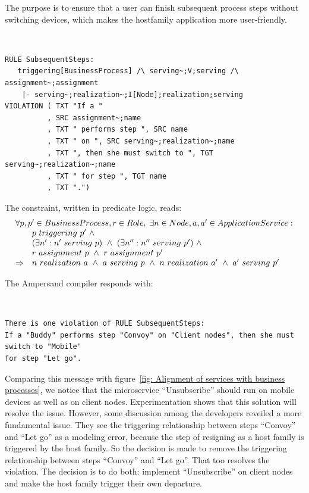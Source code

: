 \documentclass[sn-vancouver]{sn-jnl}%
\begin{document}
The purpose is to ensure that a user can finish subsequent process steps without switching devices,
which makes the hostfamily application more user-friendly.

{\tt\small
\begin{lstlisting}[frame=single, label={mc4}, caption={}]
RULE SubsequentSteps:
   triggering[BusinessProcess] /\ serving~;V;serving /\ assignment~;assignment
    |- serving~;realization~;I[Node];realization;serving
VIOLATION ( TXT "If a "
          , SRC assignment~;name
          , TXT " performs step ", SRC name
          , TXT " on ", SRC serving~;realization~;name
          , TXT ", then she must switch to ", TGT serving~;realization~;name
          , TXT " for step ", TGT name
          , TXT ".")
\end{lstlisting}
}

The constraint, written in predicate logic, reads:
\[\begin{array}{cl}
   \multicolumn{2}{l}{\forall p,p' \in BusinessProcess, r\in Role, \;\exists n\in Node, a,a'\in ApplicationService:}\\
   &p\ triggering\ p'\ \wedge\\
   &(\exists n': n'\ serving\ p)\ \wedge\ (\exists n'': n''\ serving\ p')\ \wedge\\
   &r\ assignment\ p\ \wedge\ r\ assignment\ p'\\
   \Rightarrow&n\ realization\ a\ \wedge\ a\ serving\ p\ \wedge\ n\ realization\ a'\ \wedge\ a'\ serving\ p'\\
\end{array}\]

The Ampersand compiler responds with:

{\tt\small
\begin{lstlisting}[frame=single, label={mc4result}, caption={}]
There is one violation of RULE SubsequentSteps:
If a "Buddy" performs step "Convoy" on "Client nodes", then she must switch to "Mobile"
for step "Let go".
\end{lstlisting}
}

Comparing this message with figure~\ref{fig: Alignment of services with business processes},
we notice that the microservice ``Unsubscribe'' should run on mobile devices as well as on client nodes.
Experimentation shows that this solution will resolve the issue.
However, some discussion among the developers reveiled a more fundamental issue.
They see the triggering relationship between steps ``Convoy'' and ``Let go'' as a modeling error,
because the step of resigning as a host family is triggered by the host family.
So the decision is made to remove the triggering relationship between steps ``Convoy'' and ``Let go''.
That too resolves the violation.
The decision is to do both: implement ``Unsubscribe'' on client nodes and make the host family trigger their own departure.
\end{document}
